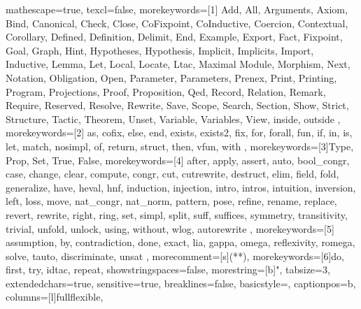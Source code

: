 
 {
mathescape=true,
texcl=false,
morekeywords=[1]{
  Add,
  All,
  Arguments,
  Axiom,
  Bind,
  Canonical,
  Check,
  Close,
  CoFixpoint,
  CoInductive,
  Coercion,
  Contextual,
  Corollary,
  Defined,
  Definition,
  Delimit,
  End,
  Example,
  Export,
  Fact,
  Fixpoint,
  Goal,
  Graph,
  Hint,
  Hypotheses,
  Hypothesis,
  Implicit,
  Implicits,
  Import,
  Inductive,
  Lemma,
  Let,
  Local,
  Locate,
  Ltac,
  Maximal
  Module,
  Morphism,
  Next,
  Notation,
  Obligation,
  Open,
  Parameter,
  Parameters,
  Prenex,
  Print,
  Printing,
  Program,
  Projections,
  Proof,
  Proposition,
  Qed,
  Record,
  Relation,
  Remark,
  Require,
  Reserved,
  Resolve,
  Rewrite,
  Save,
  Scope,
  Search,
  Section,
  Show,
  Strict,
  Structure,
  Tactic,
  Theorem,
  Unset,
  Variable,
  Variables,
  View,
  inside,
  outside
},
morekeywords=[2]{
  as,
  cofix,
  else,
  end,
  exists,
  exists2,
  fix,
  for,
  forall,
  fun,
  if,
  in,
  is,
  let,
  match,
  nosimpl,
  of,
  return,
  struct,
  then,
  vfun,
  with
},
morekeywords=[3]{Type, Prop, Set, True, False},
morekeywords=[4]{
  after,
  apply,
  assert,
  auto,
  bool_congr,
  case,
  change,
  clear,
  compute,
  congr,
  cut,
  cutrewrite,
  destruct,
  elim,
  field,
  fold,
  generalize,
  have,
  heval,
  hnf,
  induction,
  injection,
  intro,
  intros,
  intuition,
  inversion,
  left,
  loss,
  move,
  nat_congr,
  nat_norm,
  pattern,
  pose,
  refine,
  rename,
  replace,
  revert,
  rewrite,
  right,
  ring,
  set,
  simpl,
  split,
  suff,
  suffices,
  symmetry,
  transitivity,
  trivial,
  unfold,
  unlock,
  using,
  without,
  wlog,
  autorewrite
},
morekeywords=[5]{
  assumption,
  by,
  contradiction,
  done,
  exact,
  lia,
  gappa,
  omega,
  reflexivity,
  romega,
  solve,
  tauto,
  discriminate,
  unsat
},
morecomment=[s]{(*}{*)},
morekeywords=[6]{do, first, try, idtac, repeat},
showstringspaces=false,
morestring=[b]",
tabsize=3,
extendedchars=true,
sensitive=true,
breaklines=false,
basicstyle=\footnotesize\ttfamily,
captionpos=b,
columns=[l]fullflexible,
}
